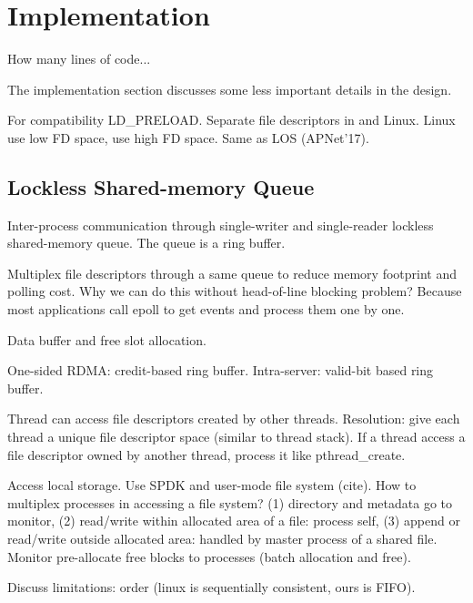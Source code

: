 \section{Implementation}
\label{sec:implementation}

How many lines of code...

The implementation section discusses some less important details in the design.


For compatibility
LD\_PRELOAD.
Separate file descriptors in \sys and Linux. Linux use low FD space, \sys use high FD space. Same as LOS (APNet'17).

\subsection{Lockless Shared-memory Queue}
\label{subsec:lockless-queue}

Inter-process communication through single-writer and single-reader lockless shared-memory queue. The queue is a ring buffer.

Multiplex file descriptors through a same queue to reduce memory footprint and polling cost. Why we can do this without head-of-line blocking problem? Because most applications call epoll to get events and process them one by one.

Data buffer and free slot allocation.

One-sided  RDMA: credit-based ring buffer. Intra-server: valid-bit based ring buffer.


Thread can access file descriptors created by other threads. Resolution: give each thread a unique file descriptor space (similar to thread stack). If a thread access a file descriptor owned by another thread, process it like pthread\_create.

Access local storage. Use SPDK and user-mode file system (cite). How to multiplex processes in accessing a file system? (1) directory and metadata go to monitor, (2) read/write within allocated area of a file: process self, (3) append or read/write outside allocated area: handled by master process of a shared file. Monitor pre-allocate free blocks to processes (batch allocation and free).

Discuss limitations: order (linux is sequentially consistent, ours is FIFO).